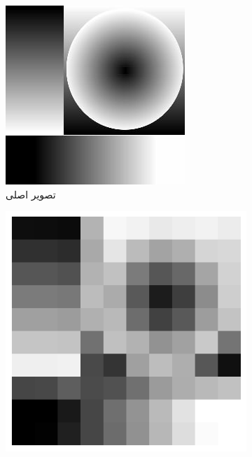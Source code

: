             \begin{figure}[htbp]
                \centering
                \begin{subfigure}[b]{0.45\textwidth}
                    \centering
                    \includegraphics[width=\textwidth]{images/slop.jpg}
                    \caption{تصویر اصلی}
                    \label{fig:waterloo-sample-original}
                \end{subfigure}
                \hfill
                \begin{subfigure}[b]{0.45\textwidth}
                    \centering
                    \includegraphics[width=\textwidth]{images/slop-resized.jpg}

\end{subfigure}
\end{figure}
